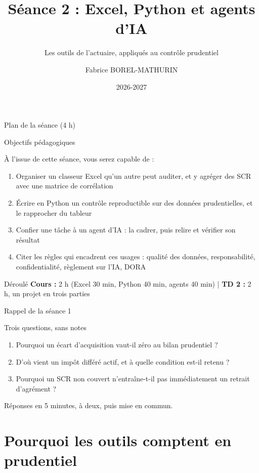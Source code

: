 \documentclass[10pt,aspectratio=169]{beamer}
\title[Séance 2 -- Excel, Python et agents d'IA]{Séance 2 : Excel, Python et agents d'IA}
\subtitle{Les outils de l'actuaire, appliqués au contrôle prudentiel}
\author[F. Borel-Mathurin]{Fabrice BOREL-MATHURIN}
\institute[ACPR-DEAR et SAF Lyon 1]{
    ACPR - DEAR\\
    et\\
    Laboratoire SAF Université Claude Bernard Lyon 1
}
\date{2026-2027}
\begin{document}
\frame{\titlepage}

\begin{frame}{Plan de la séance (4 h)}
\tableofcontents
\end{frame}

\begin{frame}{Objectifs pédagogiques}
\begin{block}{À l'issue de cette séance, vous serez capable de :}
\begin{enumerate}
  \item Organiser un classeur Excel qu'un autre peut auditer, et y agréger des SCR avec une matrice de corrélation
  \item Écrire en Python un contrôle reproductible sur des données prudentielles, et le rapprocher du tableur
  \item Confier une tâche à un agent d'IA : la cadrer, puis relire et vérifier son résultat
  \item Citer les règles qui encadrent ces usages : qualité des données, responsabilité, confidentialité, règlement sur l'IA, DORA
\end{enumerate}
\end{block}
\vspace{0.3cm}
\begin{alertblock}{Déroulé}
\textbf{Cours :} 2 h (Excel 30 min, Python 40 min, agents 40 min) \quad | \quad
\textbf{TD 2 :} 2 h, un projet en trois parties
\end{alertblock}
\end{frame}

\begin{frame}{Rappel de la séance 1}
\begin{block}{Trois questions, sans notes}
\begin{enumerate}
  \item Pourquoi un écart d'acquisition vaut-il zéro au bilan prudentiel ?
  \item D'où vient un impôt différé actif, et à quelle condition est-il retenu ?
  \item Pourquoi un SCR non couvert n'entraîne-t-il pas immédiatement un retrait d'agrément ?
\end{enumerate}
\end{block}
\vspace{0.2cm}
\small Réponses en 5 minutes, à deux, puis mise en commun.
\end{frame}

\section{Pourquoi les outils comptent en prudentiel}
\end{document}
